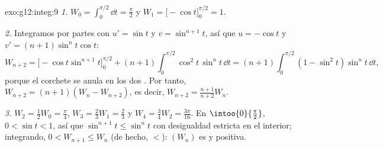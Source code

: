 \begin{solution}{exo:g12:integ:9}
\emph{1.} $W_0 = \int_0^{\pi/2} \dd t = \frac{\pi}{2}$ y
$W_1 = \bigl[-\cos t\bigr]_0^{\pi/2} = 1$.

\emph{2.} Integramos por partes con $u' = \sin t$ y $v = \sin^{n+1} t$, así
que $u = -\cos t$ y $v' = (n+1)\sin^n t \cos t$:
\[
W_{n+2} = \bigl[-\cos t \sin^{n+1} t\bigr]_0^{\pi/2}
+ (n+1)\int_0^{\pi/2} \cos^2 t\,\sin^n t\,\dd t
= (n+1)\int_0^{\pi/2} (1 - \sin^2 t)\sin^n t\,\dd t,
\]
porque el corchete se anula en los dos . Por tanto,
$W_{n+2} = (n+1)(W_n - W_{n+2})$, es decir,
$W_{n+2} = \frac{n+1}{n+2} W_n$.

\emph{3.} $W_2 = \frac12 W_0 = \frac{\pi}{4}$,
$W_3 = \frac23 W_1 = \frac23$ y $W_4 = \frac34 W_2 = \frac{3\pi}{16}$. En
$\intoo{0}{\frac\pi2}$, $0 < \sin t < 1$, así que
$\sin^{n+1} t \leq \sin^n t$ con desigualdad estricta en el interior;
integrando, $0 < W_{n+1} \leq W_n$ (de hecho, $<$): $(W_n)$ es 
y positiva.
\end{solution}

